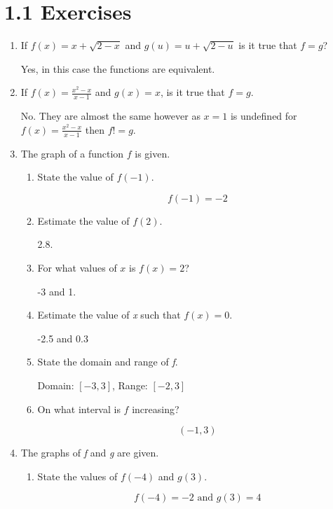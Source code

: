 \documentclass{article}
\begin{document}
	\section{1.1 Exercises}
	
	\begin{enumerate}
		\item If $f(x) = x  + \sqrt{2 - x}$ and $g(u) = u + \sqrt{2 - u}$ is it true that $f = g$?
		
			Yes, in this case the functions are equivalent.
			
		\item If $f(x) = \frac{x^2 - x}{x - 1}$ and $g(x) = x$, is it true that $f = g$.
		
			No. They are almost the same however as $x = 1$ is undefined for $f(x) = \frac{x^2 - x}{x - 1}$ 
			then $f != g$.
			
		\item The graph of a function $f$ is given.
		\begin{enumerate}
			\item State the value of $f(-1)$.
				
				$$f(-1) = -2$$
				
			\item Estimate the value of $f(2)$.
			
				2.8.
				
			\item For what values of $x$ is $f(x) = 2$?
			
				-3 and 1.
				
			\item Estimate the value of \emph{x} such that $f(x) = 0$.
			
				-2.5 and 0.3
				
			\item State the domain and range of \emph{f}.
			
				Domain: $[-3 , 3]$, Range: $[-2, 3]$
				
			\item On what interval is $f$ increasing?
			
				$$(-1, 3)$$
		\end{enumerate}
		
		\item The graphs of \emph{f} and \emph{g} are given.
		
		\begin{enumerate}
			\item State the values of $f(-4)$ and $g(3)$.
			
				$$f(-4) = -2 \text{ and } g(3) = 4$$
				

\end{enumerate}
\end{enumerate}
\end{document}
